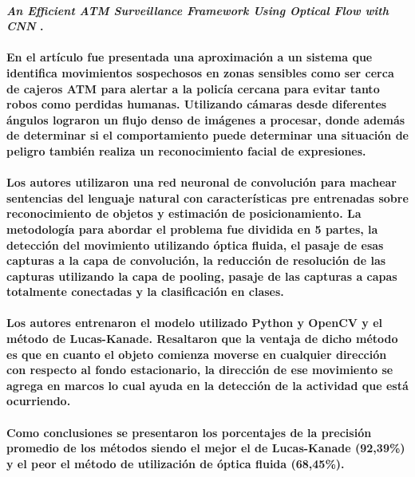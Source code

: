 \paragraph{
    \textbf{\emph{An Efficient ATM Surveillance
            Framework Using Optical Flow
            with CNN}
    }
    \cite[pág. 39]{chaudhary_microservices_2020}.
}

\paragraph{
    En el artículo fue presentada una aproximación a un sistema que identifica movimientos sospechosos en zonas sensibles como ser cerca de cajeros ATM para alertar a la policía cercana para evitar tanto robos como perdidas humanas.
    Utilizando cámaras desde diferentes ángulos lograron un flujo denso de imágenes a procesar, donde además de determinar si el comportamiento puede determinar una situación de peligro también realiza un reconocimiento facial de expresiones.
}

\paragraph{
    Los autores utilizaron una red neuronal de convolución para machear sentencias del lenguaje natural con
    características pre entrenadas sobre reconocimiento de objetos y estimación de posicionamiento.
    La metodología para abordar el problema fue dividida en 5 partes, la detección del movimiento utilizando óptica fluida, el pasaje de esas capturas a la capa de convolución, la reducción de resolución de las capturas utilizando la capa de pooling, pasaje de las capturas a capas totalmente conectadas y la clasificación en clases.
}

\paragraph{
    Los autores entrenaron el modelo utilizado Python y OpenCV y el método de Lucas-Kanade.
    Resaltaron que la ventaja de dicho método es que en cuanto el objeto comienza
    moverse en cualquier dirección con respecto al fondo estacionario, la dirección de
    ese movimiento se agrega en marcos lo cual ayuda en la detección de la actividad que está ocurriendo.
}

\paragraph{
    Como conclusiones se presentaron los porcentajes de la precisión promedio de los métodos siendo el mejor el de Lucas-Kanade (92,39\%) y el peor el método de utilización de óptica fluida (68,45\%).
}
